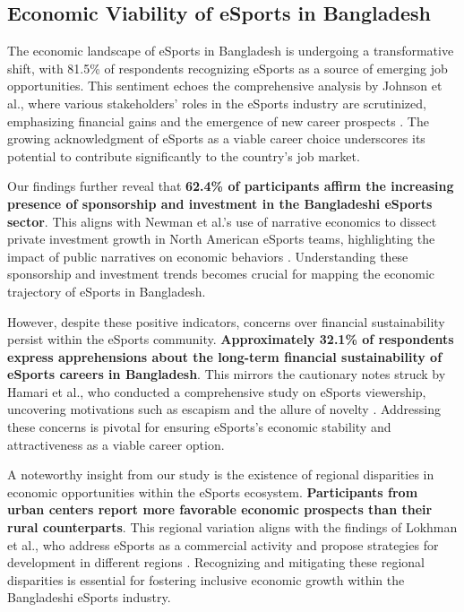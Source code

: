 \documentclass[manuscript,screen,review,anonymous]{acmart}
\begin{document}
\subsection{Economic Viability of eSports in Bangladesh}

The economic landscape of eSports in Bangladesh is undergoing a transformative shift, with 81.5\% of respondents recognizing eSports as a source of emerging job opportunities. This sentiment echoes the comprehensive analysis by Johnson et al., where various stakeholders' roles in the eSports industry are scrutinized, emphasizing financial gains and the emergence of new career prospects \cite{a7}. The growing acknowledgment of eSports as a viable career choice underscores its potential to contribute significantly to the country's job market.

Our findings further reveal that \textbf{62.4\% of participants affirm the increasing presence of sponsorship and investment in the Bangladeshi eSports sector}. This aligns with Newman et al.'s use of narrative economics to dissect private investment growth in North American eSports teams, highlighting the impact of public narratives on economic behaviors \cite{a15}. Understanding these sponsorship and investment trends becomes crucial for mapping the economic trajectory of eSports in Bangladesh.

However, despite these positive indicators, concerns over financial sustainability persist within the eSports community. \textbf{Approximately 32.1\% of respondents express apprehensions about the long-term financial sustainability of eSports careers in Bangladesh}. This mirrors the cautionary notes struck by Hamari et al., who conducted a comprehensive study on eSports viewership, uncovering motivations such as escapism and the allure of novelty \cite{a4}. Addressing these concerns is pivotal for ensuring eSports's economic stability and attractiveness as a viable career option.

A noteworthy insight from our study is the existence of regional disparities in economic opportunities within the eSports ecosystem. \textbf{Participants from urban centers report more favorable economic prospects than their rural counterparts}. This regional variation aligns with the findings of Lokhman et al., who address eSports as a commercial activity and propose strategies for development in different regions \cite{a10}. Recognizing and mitigating these regional disparities is essential for fostering inclusive economic growth within the Bangladeshi eSports industry.
\end{document}
